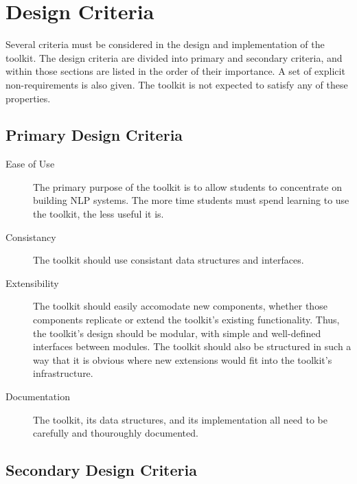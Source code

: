 \documentclass{article}
\begin{document}
\section{Design Criteria}

Several criteria must be considered in the design and implementation
of the toolkit.  The design criteria are divided into primary and
secondary criteria, and within those sections are listed in the order
of their importance.  A set of explicit non-requirements is also
given.  The toolkit is not expected to satisfy any of these
properties. 

\subsection{Primary Design Criteria}

\begin{description}

\item[Ease of Use] The primary purpose of the toolkit is to allow
students to concentrate on building NLP systems.  The more time
students must spend learning to use the toolkit, the less useful it
is.  

\item[Consistancy] The toolkit should use consistant data structures
and interfaces.

\item[Extensibility] The toolkit should easily accomodate new
components, whether those components replicate or extend the toolkit's
existing functionality.  Thus, the toolkit's design should be modular,
with simple and well-defined interfaces between modules.  The toolkit
should also be structured in such a way that it is obvious where new
extensions would fit into the toolkit's infrastructure.

\item[Documentation] The toolkit, its data structures, and its
implementation all need to be carefully and thouroughly documented.

\end{description}

\subsection{Secondary Design Criteria}
\end{document}
